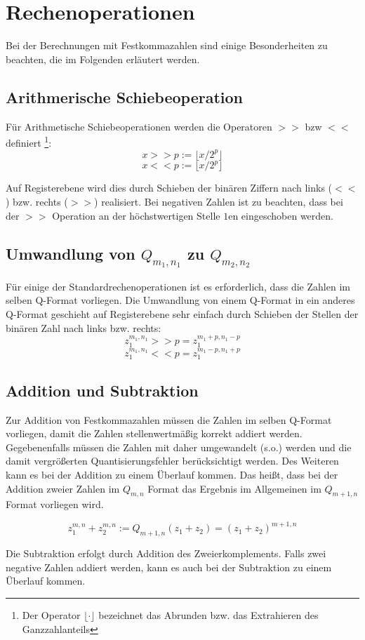 \section{Rechenoperationen}
Bei der Berechnungen mit Festkommazahlen sind einige Besonderheiten zu beachten, die im Folgenden erläutert werden.

\subsection{Arithmerische Schiebeoperation}
Für Arithmetische Schiebeoperationen werden die Operatoren $>>$ bzw $<<$ definiert \footnote{Der Operator $\lfloor \cdot \rfloor$ bezeichnet das Abrunden bzw. das Extrahieren des Ganzzahlanteils}:
\[x >> p := \lfloor x/2^p \rfloor\]
\[x << p := \lfloor x/2^p \rfloor\]

Auf Registerebene wird dies durch Schieben der binären Ziffern nach links ($<<$) bzw. rechts ($>>$) realisiert. Bei negativen Zahlen ist zu beachten, dass bei der $>>$ Operation an der höchstwertigen Stelle $1$en eingeschoben werden.

\subsection{Umwandlung von $Q_{m_1,n_1}$ zu  $Q_{m_2,n_2}$}
Für einige der Standardrechenoperationen ist es erforderlich, dass die Zahlen im selben Q-Format vorliegen. Die Umwandlung von einem Q-Format in ein anderes Q-Format geschieht auf Registerebene sehr einfach durch Schieben der Stellen der binären Zahl nach links bzw. rechts:
\[z_1^{m_1,n_1} >> p = z_1^{m_1+p,n_1-p}\]
\[z_1^{m_1,n_1} << p = z_1^{m_1-p,n_1+p}\]

\subsection{Addition und Subtraktion}
Zur Addition von Festkommazahlen müssen die Zahlen im selben Q-Format vorliegen, damit die Zahlen stellenwertmäßig korrekt addiert werden. Gegebenenfalls müssen die Zahlen mit daher umgewandelt (s.o.) werden und die damit vergrößerten Quantisierungsfehler berücksichtigt werden. Des Weiteren kann es bei der Addition zu einem Überlauf kommen. Das heißt, dass bei der Addition zweier Zahlen im $Q_{m,n}$ Format das Ergebnis im Allgemeinen im $Q_{m+1,n}$ Format vorliegen wird.

\[z_1^{m,n}+z_2^{m,n} := Q_{m+1,n}(z_1+z_2) = (z_1+z_2)^{m+1,n}\]

Die Subtraktion erfolgt durch Addition des Zweierkomplements. Falls zwei negative Zahlen addiert werden, kann es auch bei der Subtraktion zu einem Überlauf kommen.

